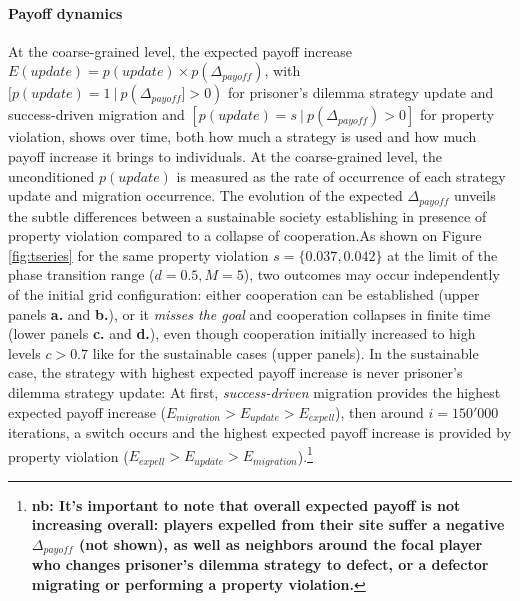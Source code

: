 \paragraph{Payoff dynamics}
At the coarse-grained level, the expected payoff increase $E(update) = p(update) \times p(\Delta_{payoff})$, with $ [p(update) = 1~|~p(\Delta_{payoff}] > 0)$ for prisoner's dilemma strategy update and success-driven migration and $[p(update) = s ~|~p(\Delta_{payoff}) > 0]$ for property violation, shows over time, both how much a strategy is used and how much payoff increase it brings to individuals. At the coarse-grained level, the unconditioned $p(update)$ is measured as the rate of occurrence of each strategy update and migration occurrence. The evolution of the expected $\Delta_{payoff}$ unveils the subtle differences between a sustainable society establishing in presence of property violation compared to a collapse of cooperation.As shown on Figure \ref{fig:tseries} for the same property violation $s = \{ 0.037, 0.042\}$ at the limit of the phase transition range ($d=0.5,M=5$), two outcomes may occur independently of the initial grid configuration: either cooperation can be established (upper panels {\bf a.} and {\bf b.}), or it {\it misses the goal} and cooperation collapses in finite time (lower panels {\bf c.} and {\bf d.}), even though cooperation initially increased to high levels $c > 0.7$ like for the sustainable cases (upper panels). In the sustainable case, the strategy with highest  expected payoff increase is never prisoner's dilemma strategy update: At first, {\it success-driven} migration provides the highest expected payoff increase ($E_{migration} > E_{update} > E_{expell}$), then around $i =150'000$ iterations, a switch occurs and the highest expected payoff increase is provided by property violation ($ E_{expell} > E_{update} > E_{migration}$).\footnote{{\bf nb: It's important to note that overall expected payoff is not increasing overall: players expelled from their site suffer a negative $\Delta_{payoff}$ (not shown), as well as neighbors around the focal player who changes prisoner's dilemma strategy to defect, or a defector migrating or performing a property violation.}}

